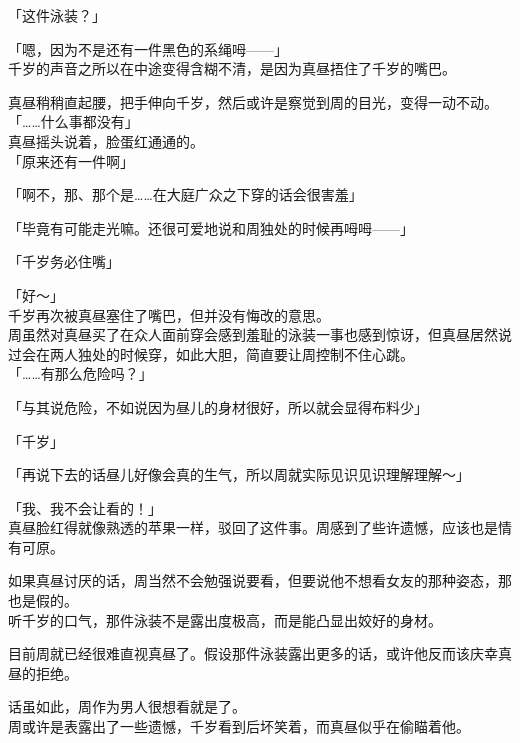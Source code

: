 「这件泳装？」

「嗯，因为不是还有一件黑色的系绳呣——」\\

千岁的声音之所以在中途变得含糊不清，是因为真昼捂住了千岁的嘴巴。

真昼稍稍直起腰，把手伸向千岁，然后或许是察觉到周的目光，变得一动不动。\\

「……什么事都没有」\\

真昼摇头说着，脸蛋红通通的。\\

「原来还有一件啊」

「啊不，那、那个是……在大庭广众之下穿的话会很害羞」

「毕竟有可能走光嘛。还很可爱地说和周独处的时候再呣呣——」

「千岁务必住嘴」

「好～」\\

千岁再次被真昼塞住了嘴巴，但并没有悔改的意思。\\

周虽然对真昼买了在众人面前穿会感到羞耻的泳装一事也感到惊讶，但真昼居然说过会在两人独处的时候穿，如此大胆，简直要让周控制不住心跳。\\

「……有那么危险吗？」

「与其说危险，不如说因为昼儿的身材很好，所以就会显得布料少」

「千岁」

「再说下去的话昼儿好像会真的生气，所以周就实际见识见识理解理解～」

「我、我不会让看的！」\\

真昼脸红得就像熟透的苹果一样，驳回了这件事。周感到了些许遗憾，应该也是情有可原。

如果真昼讨厌的话，周当然不会勉强说要看，但要说他不想看女友的那种姿态，那也是假的。\\

听千岁的口气，那件泳装不是露出度极高，而是能凸显出姣好的身材。

目前周就已经很难直视真昼了。假设那件泳装露出更多的话，或许他反而该庆幸真昼的拒绝。

话虽如此，周作为男人很想看就是了。\\

周或许是表露出了一些遗憾，千岁看到后坏笑着，而真昼似乎在偷瞄着他。\\

